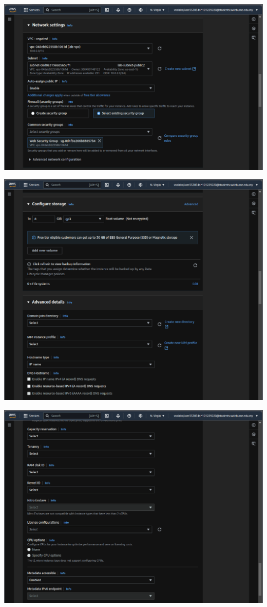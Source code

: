 \documentclass[11pt]{article}
\begin{document}
\begin{enumerate}[resume]
    {\centering
    \includegraphics[width=5.8in]{pics/14c.png}
    }


    {\centering
    \includegraphics[width=5.8in]{pics/14d.png}
    }


    {\centering
    \includegraphics[width=5.8in]{pics/14f.png}
    }



\end{enumerate}
\end{document}
